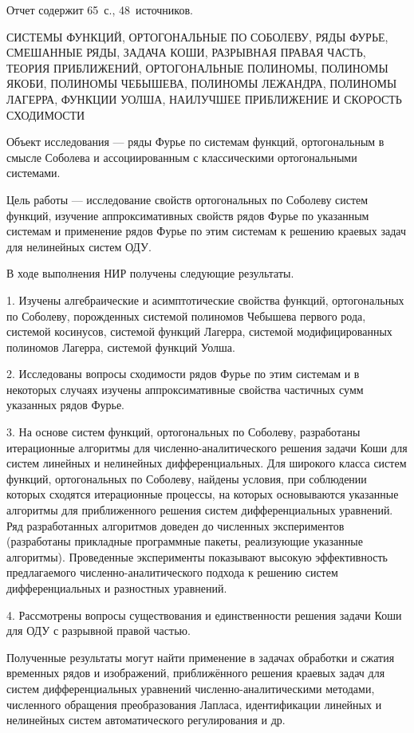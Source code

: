 \Referat %

Отчет содержит 65~с., 48~источников.

 \bigskip
  СИСТЕМЫ ФУНКЦИЙ, ОРТОГОНАЛЬНЫЕ ПО СОБОЛЕВУ, РЯДЫ ФУРЬЕ, СМЕШАННЫЕ РЯДЫ, ЗАДАЧА КОШИ, РАЗРЫВНАЯ ПРАВАЯ ЧАСТЬ,
  ТЕОРИЯ ПРИБЛИЖЕНИЙ, ОРТОГОНАЛЬНЫЕ ПОЛИНОМЫ, ПОЛИНОМЫ ЯКОБИ, ПОЛИНОМЫ ЧЕБЫШЕВА, ПОЛИНОМЫ ЛЕЖАНДРА, ПОЛИНОМЫ ЛАГЕРРА, \linebreak ФУНКЦИИ УОЛША, НАИЛУЧШЕЕ ПРИБЛИЖЕНИЕ И СКОРОСТЬ СХОДИМОСТИ

 \bigskip

Объект исследования --- ряды Фурье по системам функций, ортогональным в смысле Соболева и ассоциированным с классическими ортогональными системами.

Цель работы --- исследование свойств ортогональных по Соболеву систем функций, изучение аппроксимативных свойств рядов Фурье по указанным системам и применение рядов Фурье по этим системам к решению краевых задач для нелинейных систем ОДУ.

В ходе выполнения НИР получены следующие результаты. 

1. Изучены алгебраические и асимптотические свойства функций, ортогональных по Соболеву, порожденных системой полиномов Чебышева первого рода, системой косинусов, системой функций Лагерра, системой модифицированных полиномов Лагерра, системой функций Уолша. 

2. Исследованы вопросы сходимости рядов Фурье по этим системам и в некоторых случаях изучены аппроксимативные свойства частичных сумм указанных рядов Фурье.

3. На основе систем функций, ортогональных по Соболеву, разработаны итерационные алгоритмы для численно-аналитического решения задачи Коши для систем линейных и нелинейных дифференциальных. Для широкого класса систем функций, ортогональных по Соболеву, найдены условия, при соблюдении которых сходятся итерационные процессы, на которых основываются указанные алгоритмы для приближенного решения систем дифференциальных уравнений.
Ряд разработанных алгоритмов доведен до численных экспериментов (разработаны прикладные программные пакеты, реализующие указанные алгоритмы).
Проведенные эксперименты показывают высокую эффективность предлагаемого численно-аналитического подхода к решению систем дифференциальных и разностных уравнений.

4. Рассмотрены вопросы существования и единственности решения задачи Коши для ОДУ с разрывной правой частью.
  
Полученные результаты могут найти применение в задачах обработки и сжатия временных рядов и изображений, приближённого решения краевых задач для систем дифференциальных уравнений численно-аналитическими методами, численного обращения преобразования Лапласа, идентификации линейных и нелинейных систем автоматического регулирования и др.

